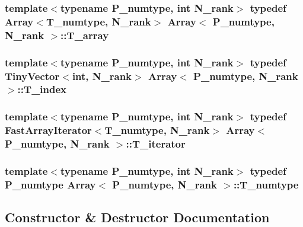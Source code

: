 \subsubsection[{T\+\_\+array}]{\setlength{\rightskip}{0pt plus 5cm}template$<$typename P\+\_\+numtype, int N\+\_\+rank$>$ typedef {\bf Array}$<${\bf T\+\_\+numtype}, N\+\_\+rank$>$ {\bf Array}$<$ P\+\_\+numtype, N\+\_\+rank $>$\+::{\bf T\+\_\+array}}\label{classArray_a6a3d9b6a214107a10df219091801f1e0}
\hypertarget{classArray_af3e455aedb140b84cee777ecdf2e846e}{}
\subsubsection[{T\+\_\+index}]{\setlength{\rightskip}{0pt plus 5cm}template$<$typename P\+\_\+numtype, int N\+\_\+rank$>$ typedef {\bf Tiny\+Vector}$<$int, N\+\_\+rank$>$ {\bf Array}$<$ P\+\_\+numtype, N\+\_\+rank $>$\+::{\bf T\+\_\+index}}\label{classArray_af3e455aedb140b84cee777ecdf2e846e}
\hypertarget{classArray_a6975ccd49584b470e7b952b8acd598f0}{}
\subsubsection[{T\+\_\+iterator}]{\setlength{\rightskip}{0pt plus 5cm}template$<$typename P\+\_\+numtype, int N\+\_\+rank$>$ typedef {\bf Fast\+Array\+Iterator}$<${\bf T\+\_\+numtype}, N\+\_\+rank$>$ {\bf Array}$<$ P\+\_\+numtype, N\+\_\+rank $>$\+::{\bf T\+\_\+iterator}}\label{classArray_a6975ccd49584b470e7b952b8acd598f0}
\hypertarget{classArray_ae72770f4a1d2f8b7193badafc320f008}{}
\subsubsection[{T\+\_\+numtype}]{\setlength{\rightskip}{0pt plus 5cm}template$<$typename P\+\_\+numtype, int N\+\_\+rank$>$ typedef P\+\_\+numtype {\bf Array}$<$ P\+\_\+numtype, N\+\_\+rank $>$\+::{\bf T\+\_\+numtype}}\label{classArray_ae72770f4a1d2f8b7193badafc320f008}


\subsection{Constructor \& Destructor Documentation}
\hypertarget{classArray_ab601a102dca824a6dc0446273965e40d}{}
